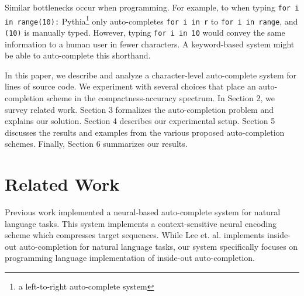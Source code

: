 \documentclass{article}
\begin{document}
Similar bottlenecks occur when programming. For example, to when typing \texttt{for i in range(10):} Pythia\footnote{a left-to-right auto-complete system} only auto-completes \texttt{for i in r} to \texttt{for i in range}, and \texttt{(10)} is manually typed. However, typing \texttt{for i in 10} would convey the same information to a human user in fewer characters. A keyword-based system might be able to auto-complete this shorthand.

In this paper, we describe and analyze a character-level auto-complete system for
lines of source code. We experiment with several
choices that place an auto-completion scheme in
the compactness-accuracy spectrum. In Section 2,
we survey related work. Section 3 formalizes the
auto-completion problem and explains our solution.
Section 4 describes our experimental setup.
Section 5 discusses the results and examples from
the various proposed auto-completion schemes.
Finally, Section 6 summarizes our results.



\section{Related Work}
Previous work implemented a neural-based auto-complete system for natural language tasks\cite{lee2019learning}. This system implements a context-sensitive neural encoding scheme which compresses target sequences. While Lee et. al. implements inside-out auto-completion for natural language tasks, our system specifically focuses on programming language implementation of inside-out auto-completion.
\end{document}
